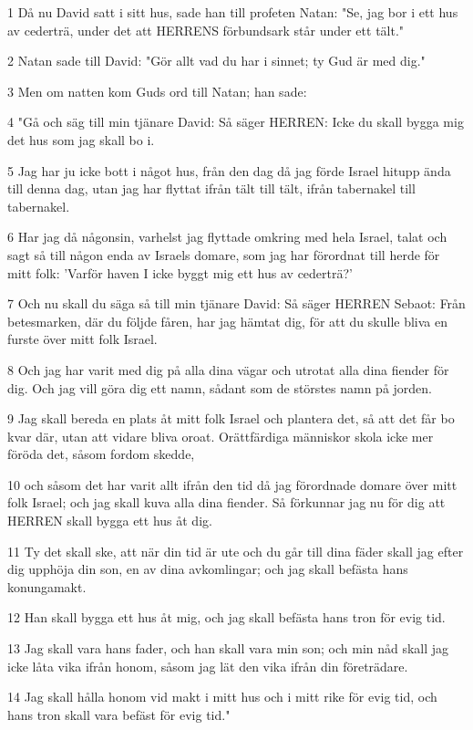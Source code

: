\par 1 Då nu David satt i sitt hus, sade han till profeten Natan: "Se, jag bor i ett hus av cederträ, under det att HERRENS förbundsark står under ett tält."
\par 2 Natan sade till David: "Gör allt vad du har i sinnet; ty Gud är med dig."
\par 3 Men om natten kom Guds ord till Natan; han sade:
\par 4 "Gå och säg till min tjänare David: Så säger HERREN: Icke du skall bygga mig det hus som jag skall bo i.
\par 5 Jag har ju icke bott i något hus, från den dag då jag förde Israel hitupp ända till denna dag, utan jag har flyttat ifrån tält till tält, ifrån tabernakel till tabernakel.
\par 6 Har jag då någonsin, varhelst jag flyttade omkring med hela Israel, talat och sagt så till någon enda av Israels domare, som jag har förordnat till herde för mitt folk: 'Varför haven I icke byggt mig ett hus av cederträ?'
\par 7 Och nu skall du säga så till min tjänare David: Så säger HERREN Sebaot: Från betesmarken, där du följde fåren, har jag hämtat dig, för att du skulle bliva en furste över mitt folk Israel.
\par 8 Och jag har varit med dig på alla dina vägar och utrotat alla dina fiender för dig. Och jag vill göra dig ett namn, sådant som de störstes namn på jorden.
\par 9 Jag skall bereda en plats åt mitt folk Israel och plantera det, så att det får bo kvar där, utan att vidare bliva oroat. Orättfärdiga människor skola icke mer föröda det, såsom fordom skedde,
\par 10 och såsom det har varit allt ifrån den tid då jag förordnade domare över mitt folk Israel; och jag skall kuva alla dina fiender. Så förkunnar jag nu för dig att HERREN skall bygga ett hus åt dig.
\par 11 Ty det skall ske, att när din tid är ute och du går till dina fäder skall jag efter dig upphöja din son, en av dina avkomlingar; och jag skall befästa hans konungamakt.
\par 12 Han skall bygga ett hus åt mig, och jag skall befästa hans tron för evig tid.
\par 13 Jag skall vara hans fader, och han skall vara min son; och min nåd skall jag icke låta vika ifrån honom, såsom jag lät den vika ifrån din företrädare.
\par 14 Jag skall hålla honom vid makt i mitt hus och i mitt rike för evig tid, och hans tron skall vara befäst för evig tid."

